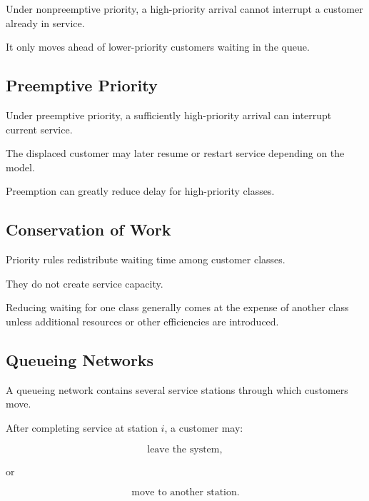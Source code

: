 Under nonpreemptive priority, a high-priority arrival cannot interrupt a
customer already in service.

It only moves ahead of lower-priority customers waiting in the queue.

\subsection{Preemptive Priority}
\label{subsec:preemptive-priority}

Under preemptive priority, a sufficiently high-priority arrival can
interrupt current service.

The displaced customer may later resume or restart service depending on
the model.

Preemption can greatly reduce delay for high-priority classes.

\subsection{Conservation of Work}
\label{subsec:queue-conservation-work}

Priority rules redistribute waiting time among customer classes.

They do not create service capacity.

Reducing waiting for one class generally comes at the expense of another
class unless additional resources or other efficiencies are introduced.

\subsection{Queueing Networks}
\label{subsec:queueing-networks}

A queueing network contains several service stations through which
customers move.

After completing service at station \(i\), a customer may:

\[
\boxed{
\text{leave the system},
}
\]

or

\[
\boxed{
\text{move to another station}.
}
\]


